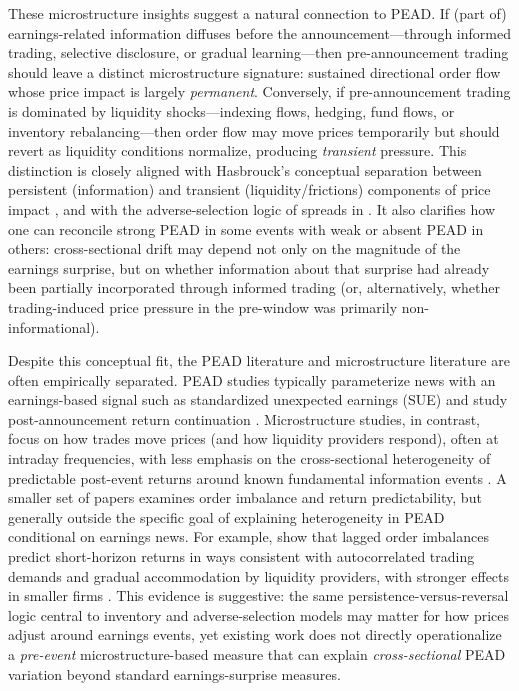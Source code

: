 These microstructure insights suggest a natural connection to PEAD.
If (part of) earnings-related information diffuses before the announcement---through informed trading,
selective disclosure, or gradual learning---then pre-announcement trading should leave a distinct
microstructure signature: sustained directional order flow whose price impact is largely \emph{permanent}.
Conversely, if pre-announcement trading is dominated by liquidity shocks---indexing flows, hedging,
fund flows, or inventory rebalancing---then order flow may move prices temporarily but should
revert as liquidity conditions normalize, producing \emph{transient} pressure. %
This distinction is closely aligned with Hasbrouck's conceptual separation between persistent
(information) and transient (liquidity/frictions) components of price impact \citep{Hasbrouck1991},
and with the adverse-selection logic of spreads in \citet{GlostenMilgrom1985}.
It also clarifies how one can reconcile strong PEAD in some events with weak or absent PEAD in others:
cross-sectional drift may depend not only on the magnitude of the earnings surprise, but on whether
information about that surprise had already been partially incorporated through informed trading
(or, alternatively, whether trading-induced price pressure in the pre-window was primarily non-informational).

Despite this conceptual fit, the PEAD literature and microstructure literature are often empirically
separated. PEAD studies typically parameterize news with an earnings-based signal such as standardized
unexpected earnings (SUE) and study post-announcement return continuation \citep{BernardThomas1989}.
Microstructure studies, in contrast, focus on how trades move prices (and how liquidity providers respond),
often at intraday frequencies, with less emphasis on the cross-sectional heterogeneity of predictable
post-event returns around known fundamental information events \citep{Kyle1985,GlostenMilgrom1985,Hasbrouck1991}. %
A smaller set of papers examines order imbalance and return predictability, but generally outside the
specific goal of explaining heterogeneity in PEAD conditional on earnings news. For example,
\citet{ChordiaSubrahmanyam2004} show that lagged order imbalances predict short-horizon returns in ways
consistent with autocorrelated trading demands and gradual accommodation by liquidity providers,
with stronger effects in smaller firms \citep{ChordiaSubrahmanyam2004}. This evidence is suggestive:
the same persistence-versus-reversal logic central to inventory and adverse-selection models may matter
for how prices adjust around earnings events, yet existing work does not directly operationalize a
\emph{pre-event} microstructure-based measure that can explain \emph{cross-sectional} PEAD variation
beyond standard earnings-surprise measures.

